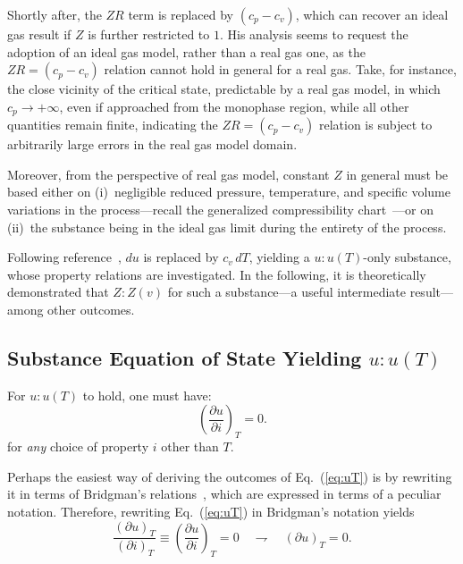 \documentclass[fleqn,11pt]{SelfArx}
\newcommand{\parxyz}[3]{\left(\frac{\partial {{#1}}}{\partial {{#2}}}\right)_{\!\!\!{#3}}}
\newcommand{\bri}[2]{(\partial {{#1}})_{{#2}}}
\begin{document}
    Shortly after, the $ZR$ term is replaced by $(c_p - c_v)$, which can recover  an  ideal  gas
    result if $Z$ is further restricted to $1$. His analysis seems to request the adoption of an
    ideal gas model, rather than a real gas one, as the $ZR = (c_p - c_v)$ relation cannot  hold
    in general for a real gas. Take, for instance, the close vicinity  of  the  critical  state,
    predictable by a real gas model, in which $c_p \to +\infty$, even  if  approached  from  the
    monophase region, while all other quantities remain finite, indicating  the  $ZR  =  (c_p  -
    c_v)$ relation is subject to arbitrarily large errors in the real gas model domain.

    Moreover, from the perspective of real gas model, constant $Z$  in  general  must  be  based
    either on (i)~negligible reduced pressure, temperature, and specific  volume  variations  in
    the           process---recall           the           generalized           compressibility
    chart~\cite{2013-CengelYA+BolesMA-AMGH}---or on (ii)~the substance being in  the  ideal  gas
    limit during the entirety of the process.

    Following reference~\cite{2012-ChristiansJ-IntJMechEngEduc}, $du$ is replaced by  $c_v\,dT$,
    yielding a $u\!:\!u(T)$-only substance, whose property relations are  investigated.  In  the
    following, it is theoretically demonstrated  that  $Z\!:\!Z(v)$  for  such  a  substance---a
    useful intermediate result---among other outcomes.

    \subsection{Substance Equation of State Yielding $u\!:\!u(T)$}

    For $u\!:\!u(T)$ to hold, one must have:
    \begin{equation}
        \parxyz uiT = 0.
        \label{eq:uT}
    \end{equation}
    \noindent for \emph{any} choice of property $i$ other than $T$.

    Perhaps the easiest way of deriving the outcomes of Eq.~(\ref{eq:uT}) is by rewriting it  in
    terms of Bridgman's relations~\cite{2006-BejanA-Wiley}, which are expressed in  terms  of  a
    peculiar notation. Therefore, rewriting Eq.~(\ref{eq:uT}) in Bridgman's notation yields
    \begin{equation}
        \frac{\bri uT}{\bri iT} \equiv \parxyz uiT = 0 \quad\rightharpoondown\quad \bri uT = 0.
        \label{eq:uT.bri}
    \end{equation}
\end{document}

